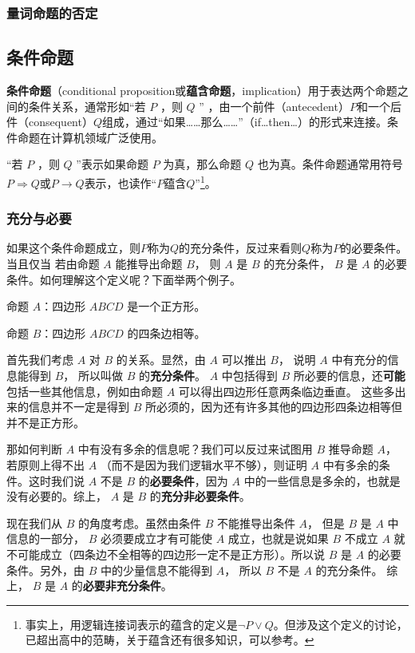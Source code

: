 \subsubsection{量词命题的否定}


\subsection{条件命题}

\textbf{条件命题}（conditional proposition或\textbf{蕴含命题}，implication）用于表达两个命题之间的条件关系，通常形如“若 $P$ ，则 $Q$ ” ，由一个前件（antecedent）$P$和一个后件（consequent）$Q$组成，通过“如果……那么……”（if…then…）的形式来连接。条件命题在计算机领域广泛使用。

“若 $P$ ，则 $Q$ ”表示如果命题 $P$ 为真，那么命题 $Q$ 也为真。条件命题通常用符号$P\Rightarrow Q$或$P\rightarrow Q$表示，也读作“$P$蕴含$Q$”\footnote{事实上，用逻辑连接词表示的蕴含的定义是$\lnot P\lor Q$。但涉及这个定义的讨论，已超出高中的范畴，关于蕴含还有很多知识，可以参考。}。

\subsubsection{充分与必要}

如果这个条件命题成立，则$P$称为$Q$的充分条件，反过来看则$Q$称为$P$的必要条件。
当且仅当
若由命题 $A$ 能推导出命题 $B$， 则 $A$ 是 $B$ 的充分条件， $B$ 是 $A$ 的必要条件。如何理解这个定义呢？下面举两个例子。

\begin{example}{}
命题 $A$：四边形 $ABCD$ 是一个正方形。

命题 $B$：四边形 $ABCD$ 的四条边相等。

首先我们考虑 $A$ 对 $B$ 的关系。显然，由 $A$ 可以推出 $B$， 说明 $A$ 中有充分的信息能得到 $B$， 所以叫做 $B$ 的\textbf{充分条件}。 $A$ 中包括得到 $B$ 所必要的信息，还\textbf{可能}包括一些其他信息，例如由命题 $A$ 可以得出四边形任意两条临边垂直。 这些多出来的信息并不一定是得到 $B$ 所必须的，因为还有许多其他的四边形四条边相等但并不是正方形。

那如何判断 $A$ 中有没有多余的信息呢？我们可以反过来试图用 $B$ 推导命题 $A$， 若原则上得不出 $A$ （而不是因为我们逻辑水平不够），则证明 $A$ 中有多余的条件。这时我们说 $A$ 不是 $B$ 的\textbf{必要条件}，因为 $A$ 中的一些信息是多余的，也就是没有必要的。综上， $A$ 是 $B$ 的\textbf{充分非必要条件}。

现在我们从 $B$ 的角度考虑。虽然由条件 $B$ 不能推导出条件 $A$， 但是 $B$ 是 $A$ 中信息的一部分， $B$ 必须要成立才有可能使 $A$ 成立，也就是说如果 $B$ 不成立 $A$ 就不可能成立（四条边不全相等的四边形一定不是正方形）。所以说 $B$ 是 $A$ 的必要条件。另外，由 $B$ 中的少量信息不能得到 $A$， 所以 $B$ 不是 $A$ 的充分条件。 综上， $B$ 是 $A$ 的\textbf{必要非充分条件}。
\end{example}


